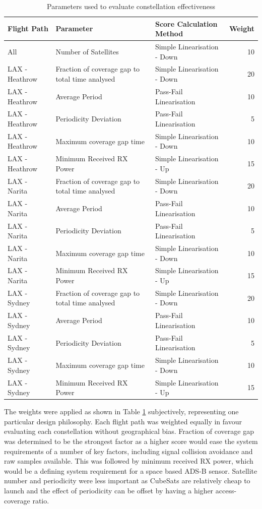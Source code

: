 \begin{table}[htbp]
  \centering
  \caption{Parameters used to evaluate constellation effectiveness}
    \begin{tabular}{lp{5cm}p{6cm}r}
    \toprule
    Flight Path & Parameter & Score Calculation Method & Weight \\
    \midrule
    All   & Number of Satellites & Simple Linearisation - Down  & 10\\
    LAX - Heathrow & Fraction of coverage gap to total time analysed & Simple Linearisation - Down & 20 \\
    LAX - Heathrow & Average Period & Pass-Fail Linearisation  & 10\\
    LAX - Heathrow & Periodicity Deviation & Pass-Fail Linearisation & 5 \\
    LAX - Heathrow & Maximum coverage gap time & Simple Linearisation - Down & 10 \\
    LAX - Heathrow & Minimum Received RX Power & Simple Linearisation - Up & 15 \\
    LAX - Narita & Fraction of coverage gap to total time analysed& Simple Linearisation - Down & 20 \\
    LAX - Narita & Average Period & Pass-Fail Linearisation & 10 \\
    LAX - Narita & Periodicity Deviation & Pass-Fail Linearisation & 5  \\
    LAX - Narita & Maximum coverage gap time & Simple Linearisation - Down & 10 \\
    LAX - Narita & Minimum Received RX Power & Simple Linearisation - Up & 15 \\
    LAX - Sydney & Fraction of coverage gap to total time analysed  & Simple Linearisation - Down & 20 \\
    LAX - Sydney & Average Period & Pass-Fail Linearisation & 10\\
    LAX - Sydney & Periodicity Deviation & Pass-Fail Linearisation & 5 \\
    LAX - Sydney & Maximum coverage gap time & Simple Linearisation - Down & 10\\
    LAX - Sydney & Minimum Received RX Power & Simple Linearisation - Up & 15\\
    \bottomrule
    \end{tabular}%
  \label{tab:parameters}%
\end{table}%

The weights were applied as shown in Table \ref{tab:parameters} subjectively, representing one particular design philosophy. Each flight path was weighted equally in favour evaluating each constellation without geographical bias. Fraction of coverage gap was determined to be the strongest factor as a higher score would ease the system requirements of a number of key factors, including signal collision avoidance and raw samples available. This was followed by minimum received RX power, which would be a defining system requirement for a space based ADS-B sensor. Satellite number and periodicity were less important as CubeSats are relatively cheap to launch and the effect of periodicity can be offset by having a higher access-coverage ratio. 


